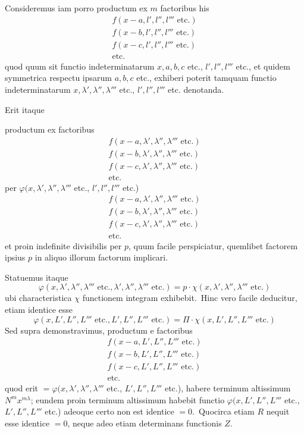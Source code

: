 \documentclass[12pt,a4paper]{article}
\theoremstyle{plain}
\begin{document}
Consideremus iam porro productum ex $m$ factoribus his
\begin{gather*}
f(x-a, l', l'', l''' \text{ etc.}) \\
f(x-b, l', l'', l''' \text{ etc.}) \\
f(x-c, l', l'', l''' \text{ etc.}) \\
\text{etc.}
\end{gather*}
quod quum sit functio indeterminatarum $x, a, b, c$ etc., $l', l'', l'''$ etc., et quidem
symmetrica respectu ipsarum $a, b, c$ etc., exhiberi poterit tamquam functio indeterminatarum $x, \lambda', \lambda'', \lambda'''$ etc., $l', l'', l'''$ etc.
denotanda.

Erit itaque

productum ex factoribus
\begin{gather*}
f(x-a, \lambda', \lambda'', \lambda''' \text{ etc.}) \\
f(x-b, \lambda', \lambda'', \lambda''' \text{ etc.}) \\
f(x-c, \lambda', \lambda'', \lambda''' \text{ etc.}) \\
\text{etc.}
\end{gather*}
per $\varphi(x, \lambda', \lambda'', \lambda'''$ etc., $l', l'', l'''$ etc.)
\begin{gather*}
f(x-a, \lambda', \lambda'', \lambda''' \text{ etc.}) \\
f(x-b, \lambda', \lambda'', \lambda''' \text{ etc.}) \\
f(x-c, \lambda', \lambda'', \lambda''' \text{ etc.}) \\
\text{etc.}
\end{gather*}
et proin indefinite divisibilis per $p$, quum facile perspiciatur, quemlibet factorem
ipsius $p$ in aliquo illorum factorum implicari.

Statuemus itaque
\[
\varphi(x, \lambda', \lambda'', \lambda''' \text{ etc.}, \lambda', \lambda'', \lambda''' \text{ etc.}) = p \cdot \chi(x, \lambda', \lambda'', \lambda''' \text{ etc.})
\]
ubi characteristica $\chi$ functionem integram exhibebit.\ Hinc vero facile deducitur,
etiam identice esse
\[
\varphi(x, L', L'', L''' \text{ etc.}, L', L'', L''' \text{ etc.}) = \Pi \cdot \chi(x, L', L'', L''' \text{ etc.})
\]
Sed supra demonstravimus, productum e factoribus
\begin{gather*}
f(x-a, L', L'', L''' \text{ etc.}) \\
f(x-b, L', L'', L''' \text{ etc.}) \\
f(x-c, L', L'', L''' \text{ etc.}) \\
\text{etc.}
\end{gather*}
quod erit $= \varphi(x, \lambda', \lambda'', \lambda'''$ etc., $L', L'', L'''$ etc.), habere terminum altissimum
$N^m x^{m\lambda}$; eundem proin terminum altissimum habebit functio $\varphi(x, L', L'', L'''$ etc.,
$L', L'', L'''$ etc.) adeoque certo non est identice $= 0$.\ Quocirca etiam $R$ nequit
esse identice $= 0$, neque adeo etiam determinans functionis $Z$.
\end{document}
